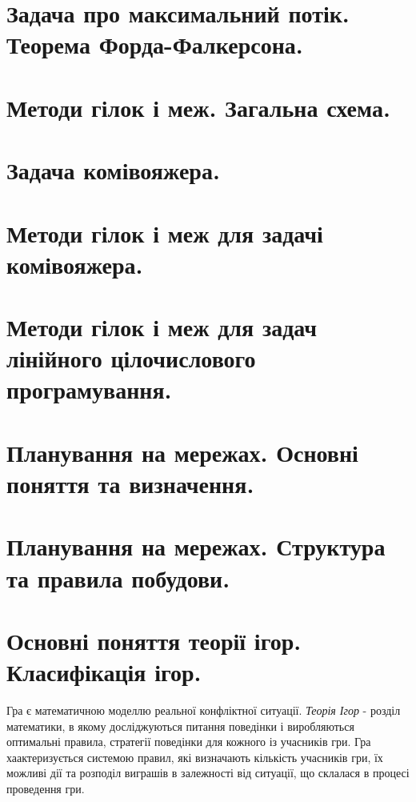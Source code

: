 \documentclass[12pt,a4paper]{article}
\begin{document}
\section{Задача про максимальний потік. Теорема Форда-Фалкерсона.}

\clearpage

\section{Методи гілок і меж. Загальна схема.}

\clearpage

\section{Задача комівояжера.}

\clearpage

\section{Методи гілок і меж для задачі комівояжера.}

\clearpage

\section{Методи гілок і меж для задач лінійного цілочислового програмування.}

\clearpage


\section{Планування на мережах. Основні поняття та визначення.}

\clearpage

\section{Планування на мережах. Структура та правила побудови.}

\clearpage

\section{Основні поняття теорії ігор. Класифікація ігор.}

Гра є математичною моделлю реальної конфліктної ситуації. \emph{Теорія Ігор} - розділ математики, в якому досліджуються питання поведінки і виробляються оптимальні правила, стратегії поведінки для кожного із учасників гри. Гра хаактеризується системою правил, які визначають кількість учасників гри, їх можливі дії та розподіл виграшів в залежності від ситуації, що склалася в процесі проведення гри.
\end{document}
